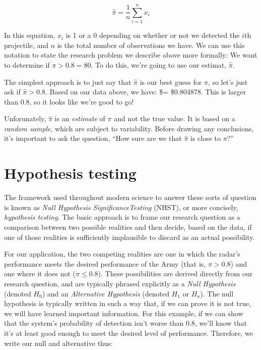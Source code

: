 \documentclass[
]{book}
\theoremstyle{definition}
\theoremstyle{definition}
\theoremstyle{definition}
\theoremstyle{remark}
\begin{document}
\[\hat\pi = \frac{1}{n}\sum_{i = 1}^n x_i\]

In this equation, \(x_i\) is 1 or a 0 depending on whether or not we detected the \(i\)th projectile, and \(n\) is the total number of observations we have. We can use this notation to state the research problem we describe above more formally: We want to determine if \(\pi > 0.8 = 80%
\). To do this, we're going to use our estimat, \(\hat \pi\).

The simplest approach is to just say that \(\hat \pi\) is our best guess for \(\pi\), so let's just ask if \(\hat \pi> 0.8\). Based on our data above, we have: \$\hat\pi = \$0.804878. This is larger than 0.8, so it looks like we're good to go!

Unforunately, \(\hat \pi\) is an \emph{estimate} of \(\pi\) and not the true value. It is based on a \emph{random sample}, which are subject to variability. Before drawing any conclusions, it's important to ask the question, ``How sure are we that \(\hat\pi\) is close to \(\pi\)?''

\hypertarget{hypothesis-testing}{%
\section{Hypothesis testing}\label{hypothesis-testing}}

The framework used throughout modern science to answer these sorts of question is known as \emph{Null Hypothesis SignificanceTesting} (NHST), or more concisely, \emph{hypothesis testing}. The basic approach is to frame our research question as a comparison between two possible realities and then decide, based on the data, if one of those realities is sufficiently implausible to discard as an actual possibility.

For our application, the two competing realities are one in which the radar's performance meets the desired performance of the Army (that is, \(\pi > 0.8\)) and one where it does not (\(\pi \le 0.8\)). These possibilities are derived directly from our research question, and are typically phrased explicitly as a \emph{Null Hypothesis} (denoted \(H_0\)) and an \emph{Alternative Hypothesis} (denoted \(H_1\) or \(H_a\)). The null hypothesis is typically written in such a way that, if we can prove it is not true, we will have learned important information. For this example, if we can show that the system's probability of detection isn't worse than \(0.8\), we'll know that it's at least good enough to meet the desired level of performance. Therefore, we write our null and alternative thus:
\end{document}
